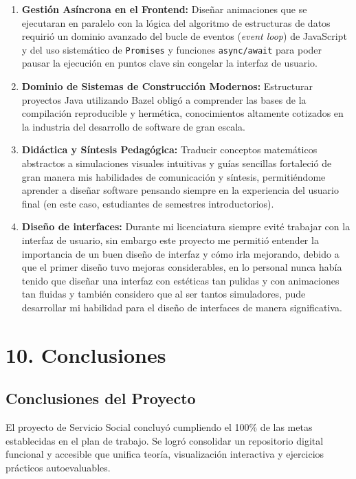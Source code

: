 \documentclass[12 pt]{article}
\begin{document}
\begin{enumerate}
    \item \textbf{Gestión Asíncrona en el Frontend:} Diseñar animaciones que se ejecutaran en paralelo con la lógica del algoritmo de estructuras de datos requirió un dominio avanzado del bucle de eventos (\emph{event loop}) de JavaScript y del uso sistemático de \texttt{Promises} y funciones \texttt{async/await} para poder pausar la ejecución en puntos clave sin congelar la interfaz de usuario.
    \item \textbf{Dominio de Sistemas de Construcción Modernos:} Estructurar proyectos Java utilizando Bazel obligó a comprender las bases de la compilación reproducible y hermética, conocimientos altamente cotizados en la industria del desarrollo de software de gran escala.
    \item \textbf{Didáctica y Síntesis Pedagógica:} Traducir conceptos matemáticos abstractos a simulaciones visuales intuitivas y guías sencillas fortaleció de gran manera mis habilidades de comunicación y síntesis, permitiéndome aprender a diseñar software pensando siempre en la experiencia del usuario final (en este caso, estudiantes de semestres introductorios).
    \item \textbf{Diseño de interfaces:} Durante mi licenciatura siempre evité trabajar con la interfaz de usuario, sin embargo este proyecto me permitió entender la importancia de un buen diseño de interfaz y cómo irla mejorando, debido a que el primer diseño tuvo mejoras considerables, en lo personal nunca había tenido que diseñar una interfaz con estéticas tan pulidas y con animaciones tan fluidas y también considero que al ser tantos simuladores, pude desarrollar mi habilidad para el diseño de interfaces de manera significativa.
\end{enumerate}

\section*{10. Conclusiones}

\subsection*{Conclusiones del Proyecto}
El proyecto de Servicio Social concluyó cumpliendo el 100\% de las metas establecidas en el plan de trabajo. Se logró consolidar un repositorio digital funcional y accesible que unifica teoría, visualización interactiva y ejercicios prácticos autoevaluables. 
\end{document}
